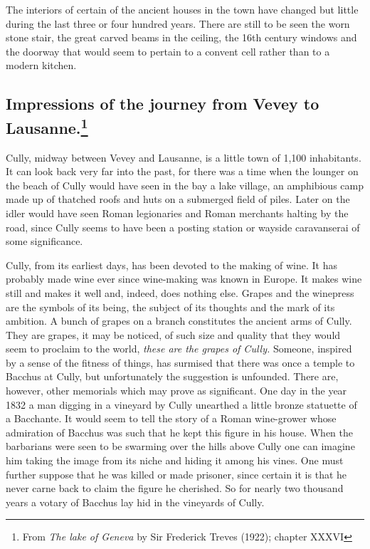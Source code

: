 \documentclass[11pt,a4paper,twocolumn]{article}
\begin{document}
The interiors of certain of the ancient houses in the town have changed but
little during the last three or four hundred years. There are still to be
seen the worn stone stair, the great carved beams in the ceiling, the 16th
century windows and the doorway that would seem to pertain to a convent cell
rather than to a modern kitchen.

\heading

\subsection*{Impressions of the journey from \mbox{Vevey} to Lausanne.\footnote{From
\emph{The lake of Geneva} by Sir Frederick Treves (1922); chapter XXXVI}}

Cully, midway between Vevey and Lausanne, is a little town of 1,100
inhabitants. It can look back very far into the past, for there was a time
when the lounger on the beach of Cully would have seen in the bay a lake
village, an amphibious camp made up of thatched roofs and huts on a submerged
field of piles. Later on the idler would have seen Roman legionaries and
Roman merchants halting by the road, since Cully seems to have been a posting
station or wayside caravanserai of some significance.

Cully, from its earliest days, has been devoted to the making of wine. It has
probably made wine ever since wine-making was known in Europe. It makes wine
still and makes it well and, indeed, does nothing else. Grapes and the
winepress are the symbols of its being, the subject of its thoughts and the
mark of its ambition. A bunch of grapes on a branch constitutes the ancient
arms of Cully. They are grapes, it may be noticed, of such size and quality
that they would seem to proclaim to the world, \emph{these are the grapes of
Cully.}  Someone, inspired by a sense of the fitness of things, has surmised
that there was once a temple to Bacchus at Cully, but unfortunately the
suggestion is unfounded. There are, however, other memorials which may prove
as significant. One day in the year 1832 a man digging in a vineyard by Cully
unearthed a little bronze statuette of a Bacchante. It would seem to tell the
story of a Roman wine-grower whose admiration of Bacchus was such that he
kept this figure in his house. When the barbarians were seen to be swarming
over the hills above Cully one can imagine him taking the image from its
niche and hiding it among his vines. One must further suppose that he was
killed or made prisoner, since certain it is that he never carne back to
claim the figure he cherished. So for nearly two thousand years a votary of
Bacchus lay hid in the vineyards of Cully.
\end{document}
